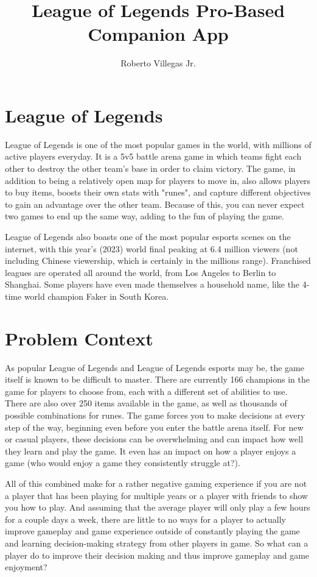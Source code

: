 \documentclass[10pt,twocolumn]{article}
\title{League of Legends Pro-Based Companion App}
\author{Roberto Villegas Jr.}
\affiliation{Occidental College}
\begin{document}
\maketitle

\section{League of Legends}

League of Legends is one of the most popular games in the world, with millions of active players everyday.
It is a 5v5 battle arena game in which teams fight each other to destroy the other team's base in order to claim victory.
The game, in addition to being a relatively open map for players to move in, also allows players to buy items, boosts their own stats with "runes", and capture different objectives to gain an advantage over the other team.
Because of this, you can never expect two games to end up the same way, adding to the fun of playing the game.

League of Legends also boasts one of the most popular esports scenes on the internet, with this year's (2023) world final peaking at 6.4 million viewers (not including Chinese viewership, which is certainly in the millions range)\cite{EsportsChartsWorlds2023}.
Franchised leagues are operated all around the world, from Los Angeles to Berlin to Shanghai.
Some players have even made themselves a household name, like the 4-time world champion Faker in South Korea.

\section{Problem Context}
As popular League of Legends and League of Legends esports may be, the game itself is known to be difficult to master.
There are currently 166 champions\cite{LoLWikiListOfChampions} in the game for players to choose from, each with a different set of abilities to use.
There are also over 250 items\cite{LolWikiListOfItems} available in the game, as well as thousands of possible combinations for runes\cite{LolWikiRunes}.
The game forces you to make decisions at every step of the way, beginning even before you enter the battle arena itself.
For new or casual players, these decisions can be overwhelming and can impact how well they learn and play the game.
It even has an impact on how a player enjoys a game (who would enjoy a game they consistently struggle at?).

All of this combined make for a rather negative gaming experience if you are not a player that has been playing for multiple years or a player with friends to show you how to play.
And assuming that the average player will only play a few hours for a couple days a week, there are little to no ways for a player to actually improve gameplay and game experience outside of constantly playing the game and learning decision-making strategy from other players in game.
So what can a player do to improve their decision making and thus improve gameplay and game enjoyment?
\end{document}
